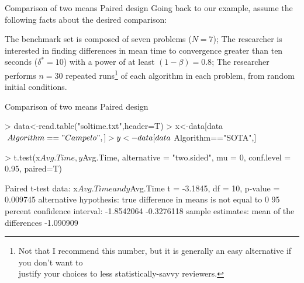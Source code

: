 \documentclass[t]{beamer}
\begin{document}
\begin{ftst}
{Comparison of two means}
{Paired design}
Going back to our example, assume the following facts about the desired comparison:

\bitems The benchmark set is composed of seven problems ($N=7$);
\spitem The researcher is interested in finding differences in mean time to convergence greater than ten seconds ($\delta^*=10$) with a power of at least $(1-\beta)=0.8$;
\spitem The researcher performs $n=30$ repeated runs\footnote[2]{\tiny Not that I recommend this number, but it is generally an easy alternative if you don't want to\\justify your choices to less statistically-savvy reviewers.} of each algorithm in each problem, from random initial conditions.
\eitem

\end{ftst}

\begin{ftstf}
{Comparison of two means}
{Paired design}
\begin{rcode}
> data<-read.table("soltime.txt",header=T)
> x<-data[data$Algorithm=="Campelo",]
> y<-data[data$Algorithm=="SOTA",]

> t.test(x$Avg.Time, y$Avg.Time,
         alternative = "two.sided",
         mu = 0, conf.level = 0.95, 
         paired=T)

Paired t-test
data:  x$Avg.Time and y$Avg.Time
t = -3.1845, df = 10, p-value = 0.009745
alternative hypothesis: true difference in means is not equal to 0
95 percent confidence interval:
 -1.8542064 -0.3276118
sample estimates:
mean of the differences 
              -1.090909 
 \end{rcode}
\end{ftstf}
\end{document}
